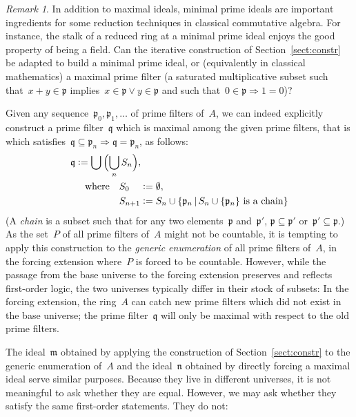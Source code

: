 \documentclass[com,11pt,crcready]{iosart2x}
\theoremstyle{definition}
\theoremstyle{plain}
\theoremstyle{remark}
\newtheorem{remark}[definition]{Remark}
\newcommand{\?}{\,{:}\,}
\newcommand{\mmm}{\mathfrak{m}}
\newcommand{\nnn}{\mathfrak{n}}
\newcommand{\ppp}{\mathfrak{p}}
\newcommand{\qqq}{\mathfrak{q}}
\newcommand{\defeq}{\vcentcolon=}
\renewcommand{\_}{\mathpunct{.}\,}
\begin{document}
\begin{remark}In addition to maximal ideals, minimal prime ideals are important
ingredients for some reduction techniques in classical commutative algebra. For
instance, the stalk of a reduced ring at a minimal prime ideal enjoys the good
property of being a field. Can the iterative construction of Section~\ref{sect:constr} be adapted to
build a minimal prime ideal, or (equivalently in classical mathematics) a maximal prime
filter (a saturated multiplicative subset such that~$x + y \in \ppp$
implies~$x \in \ppp \vee y \in \ppp$ and such that~$0 \in \ppp \Rightarrow 1 = 0$)?

Given any sequence~$\ppp_0,\ppp_1,\ldots$ of prime filters of~$A$, we can indeed
explicitly construct a prime filter~$\qqq$ which is maximal among the given
prime filters, that is which satisfies~$\qqq \subseteq \ppp_n \Rightarrow \qqq
= \ppp_n$, as follows:
\begin{align*}
  \qqq &\defeq \bigcup\,\Bigl(\bigcup_n S_n\Bigr), \\
  &\quad\text{where}\quad S_{0\phantom{{}+n}} \defeq \emptyset, \\
  &\quad\phantom{\text{where}\quad} S_{n+1} \defeq S_n \cup \{ \ppp_n \,|\,
  \text{$S_n \cup \{\ppp_n\}$ is a chain} \}
\end{align*}
(A \emph{chain} is a subset such that for any two elements~$\ppp$ and~$\ppp'$,
$\ppp \subseteq \ppp'$ or~$\ppp' \subseteq \ppp$.) As the set~$P$ of all prime
filters of~$A$ might not be countable, it is tempting to apply this
construction to the \emph{generic enumeration} of all prime filters of~$A$,
in the forcing extension where~$P$ is forced to be countable. However,
while the passage from the base universe to the forcing extension preserves and
reflects first-order logic, the two universes typically differ in their stock
of subsets: In the forcing extension, the ring~$A$ can catch new prime filters
which did not exist in the base universe; the prime filter~$\qqq$ will only be
maximal with respect to the old prime filters.
\end{remark}


\color{gray}

The ideal~$\mmm$ obtained by applying the construction of Section~\ref{sect:constr} to
the generic enumeration of~$A$ and the ideal~$\nnn$ obtained by directly forcing a
maximal ideal serve similar purposes. Because they live in different universes,
it is not meaningful to ask whether they are equal. However, we may ask whether
they satisfy the same first-order statements. They do not:
\end{document}
